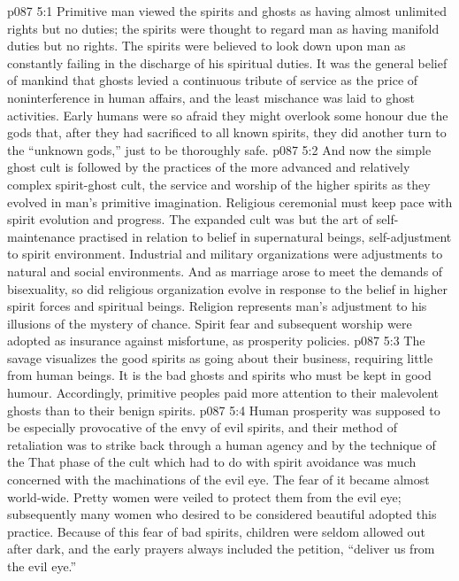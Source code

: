 \vs p087 5:1 Primitive man viewed the spirits and ghosts as having almost unlimited rights but no duties; the spirits were thought to regard man as having manifold duties but no rights. The spirits were believed to look down upon man as constantly failing in the discharge of his spiritual duties. It was the general belief of mankind that ghosts levied a continuous tribute of service as the price of noninterference in human affairs, and the least mischance was laid to ghost activities. Early humans were so afraid they might overlook some honour due the gods that, after they had sacrificed to all known spirits, they did another turn to the “unknown gods,” just to be thoroughly safe.
\vs p087 5:2 And now the simple ghost cult is followed by the practices of the more advanced and relatively complex spirit\hyp{}ghost cult, the service and worship of the higher spirits as they evolved in man’s primitive imagination. Religious ceremonial must keep pace with spirit evolution and progress. The expanded cult was but the art of self\hyp{}maintenance practised in relation to belief in supernatural beings, self\hyp{}adjustment to spirit environment. Industrial and military organizations were adjustments to natural and social environments. And as marriage arose to meet the demands of bisexuality, so did religious organization evolve in response to the belief in higher spirit forces and spiritual beings. Religion represents man’s adjustment to his illusions of the mystery of chance. Spirit fear and subsequent worship were adopted as insurance against misfortune, as prosperity policies.
\vs p087 5:3 The savage visualizes the good spirits as going about their business, requiring little from human beings. It is the bad ghosts and spirits who must be kept in good humour. Accordingly, primitive peoples paid more attention to their malevolent ghosts than to their benign spirits.
\vs p087 5:4 Human prosperity was supposed to be especially provocative of the envy of evil spirits, and their method of retaliation was to strike back through a human agency and by the technique of the  That phase of the cult which had to do with spirit avoidance was much concerned with the machinations of the evil eye. The fear of it became almost world\hyp{}wide. Pretty women were veiled to protect them from the evil eye; subsequently many women who desired to be considered beautiful adopted this practice. Because of this fear of bad spirits, children were seldom allowed out after dark, and the early prayers always included the petition, “deliver us from the evil eye.”
